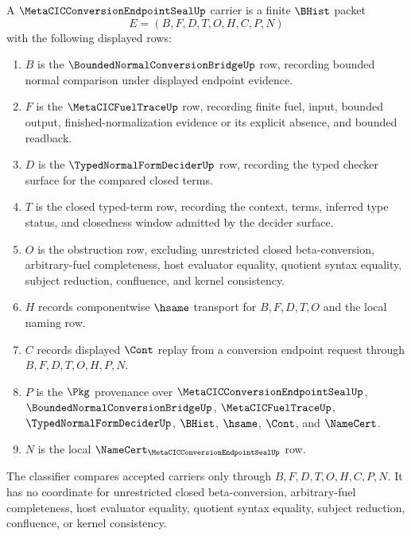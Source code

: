 \begin{definition}
\label{def:metacic-conversion-endpoint-seal-carrier}
A $\MetaCICConversionEndpointSealUp$ carrier is a finite $\BHist$ packet
$$
E=(B,F,D,T,O,H,C,P,N)
$$
with the following displayed rows:
\begin{enumerate}
\item $B$ is the $\BoundedNormalConversionBridgeUp$ row, recording bounded normal comparison under displayed endpoint evidence.
\item $F$ is the $\MetaCICFuelTraceUp$ row, recording finite fuel, input, bounded output, finished-normalization evidence or its explicit absence, and bounded readback.
\item $D$ is the $\TypedNormalFormDeciderUp$ row, recording the typed checker surface for the compared closed terms.
\item $T$ is the closed typed-term row, recording the context, terms, inferred type status, and closedness window admitted by the decider surface.
\item $O$ is the obstruction row, excluding unrestricted closed beta-conversion, arbitrary-fuel completeness, host evaluator equality, quotient syntax equality, subject reduction, confluence, and kernel consistency.
\item $H$ records componentwise $\hsame$ transport for $B,F,D,T,O$ and the local naming row.
\item $C$ records displayed $\Cont$ replay from a conversion endpoint request through $B,F,D,T,O,H,P,N$.
\item $P$ is the $\Pkg$ provenance over $\MetaCICConversionEndpointSealUp$, $\BoundedNormalConversionBridgeUp$, $\MetaCICFuelTraceUp$, $\TypedNormalFormDeciderUp$, $\BHist$, $\hsame$, $\Cont$, and $\NameCert$.
\item $N$ is the local $\NameCert_{\MetaCICConversionEndpointSealUp}$ row.
\end{enumerate}
The classifier compares accepted carriers only through $B,F,D,T,O,H,C,P,N$. It has no coordinate for unrestricted closed beta-conversion, arbitrary-fuel completeness, host evaluator equality, quotient syntax equality, subject reduction, confluence, or kernel consistency.
\end{definition}

